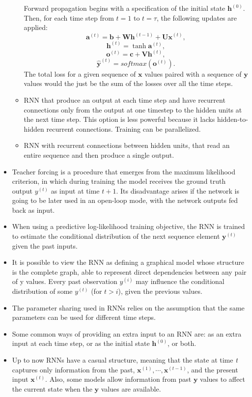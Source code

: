 \documentclass{article}
\begin{document}
\begin{itemize}
\begin{itemize}
Forward propagation begins with a specification of the initial state \(\boldsymbol{h}^{(0)}\). Then, for each time step from \(t = 1\) to \(t = \tau\), the following updates are applied:
\[
	\boldsymbol{a}^{(t)} = \boldsymbol{b} + \boldsymbol{Wh}^{(t-1)} + \boldsymbol{Ux}^{(t)},
\]
\[
	\boldsymbol{h}^{(t)} = \tanh{\boldsymbol{a}^{(t)}},
\]
\[
	\boldsymbol{o}^{(t)} = \boldsymbol{c} + \boldsymbol{Vh}^{(t)},
\]
\[
	\hat{\boldsymbol{y}}^{(t)} = softmax(\boldsymbol{o}^{(t)}).
\]
The total loss for a given sequence of \(\boldsymbol{x}\) values paired with a sequence of \(\boldsymbol{y}\) values would the just be the sum of the losses over all the time steps.
\item RNN that produce an output at each time step and have recurrent connections only from the output at one timestep to the hidden units at the next time step. This option is less powerful because it lacks hidden-to-hidden recurrent connections. Training can be parallelized.
\item RNN with recurrent connections between hidden units, that read an entire sequence and then produce a single output.
\end{itemize}
\item Teacher forcing is a procedure that emerges from the maximum likelihood criterion, in which during training the model receives the ground truth output \(y^{(t)}\) as input at time \(t + 1\). Its disadvantage arises if the network is going to be later used in an open-loop mode, with the network outputs fed back as input.
\item When using a predictive log-likelihood training objective, the RNN is trained to estimate the conditional distribution of the next sequence element \(\boldsymbol{y}^{(t)}\) given the past inputs.
\item It is possible to view the RNN as defining a graphical model whose structure is the complete graph, able to represent direct dependencies between any pair of y values. Every past observation \(y^{(i)}\) may influence the conditional distribution of some \(y^{(t)}\) (for \(t > i\)), given the previous values.
\item The parameter sharing used in RNNs relies on the assumption that the same parameters can be used for different time steps.
\item Some common ways of providing an extra input to an RNN are: as an extra input at each time step, or as the initial state \(\boldsymbol{h}^{(0)}\), or both.
\item Up to now RNNs have a casual structure, meaning that the state at time \textit{t} captures only information from the past, \(\boldsymbol{x}^{(1)}, \cdots, \boldsymbol{x}^{(t-1)}\), and the present input \(\boldsymbol{x}^{(t)}\). Also, some models allow information from past \(\boldsymbol{y}\) values to affect the current state when the \(\boldsymbol{y}\) values are available.

\end{itemize}
\end{document}
